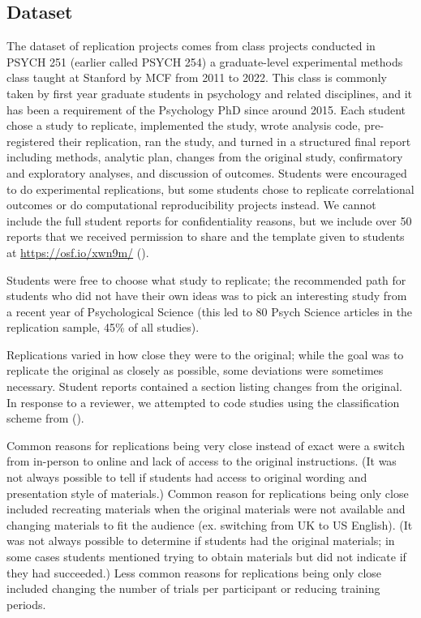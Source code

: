 \documentclass[
  english,
  a4paper,
]{article}
\begin{document}
\subsection{Dataset}\label{dataset}

The dataset of replication projects comes from class projects conducted in PSYCH 251 (earlier called PSYCH 254) a graduate-level experimental methods class taught at Stanford by MCF from 2011 to 2022. This class is commonly taken by first year graduate students in psychology and related disciplines, and it has been a requirement of the Psychology PhD since around 2015. Each student chose a study to replicate, implemented the study, wrote analysis code, pre-registered their replication, ran the study, and turned in a structured final report including methods, analytic plan, changes from the original study, confirmatory and exploratory analyses, and discussion of outcomes. Students were encouraged to do experimental replications, but some students chose to replicate correlational outcomes or do computational reproducibility projects instead. We cannot include the full student reports for confidentiality reasons, but we include over 50 reports that we received permission to share and the template given to students at \url{https://osf.io/xwn9m/} ().

Students were free to choose what study to replicate; the recommended path for students who did not have their own ideas was to pick an interesting study from a recent year of Psychological Science (this led to 80 Psych Science articles in the replication sample, 45\% of all studies).

Replications varied in how close they were to the original; while the goal was to replicate the original as closely as possible, some deviations were sometimes necessary. Student reports contained a section listing changes from the original. In response to a reviewer, we attempted to code studies using the classification scheme from ().

Common reasons for replications being very close instead of exact were a switch from in-person to online and lack of access to the original instructions. (It was not always possible to tell if students had access to original wording and presentation style of materials.) Common reason for replications being only close included recreating materials when the original materials were not available and changing materials to fit the audience (ex. switching from UK to US English). (It was not always possible to determine if students had the original materials; in some cases students mentioned trying to obtain materials but did not indicate if they had succeeded.) Less common reasons for replications being only close included changing the number of trials per participant or reducing training periods.
\end{document}
